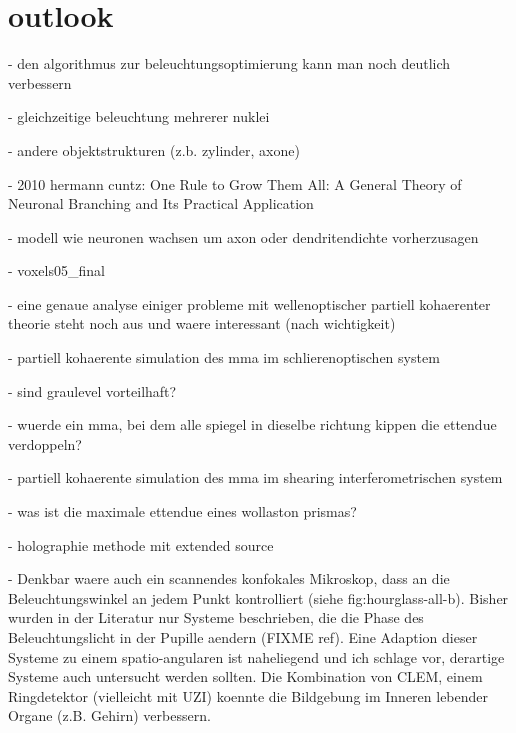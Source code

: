 \documentclass[oneside,a4paper,12pt,BCOR20mm,DIV14]{scrbook}
\begin{document}
\chapter{outlook}
\label{sec:outlook}
- den algorithmus zur beleuchtungsoptimierung kann man noch deutlich
  verbessern

  - gleichzeitige beleuchtung mehrerer nuklei

  - andere objektstrukturen (z.b. zylinder, axone)

    - 2010 hermann cuntz: One Rule to Grow Them All: A General Theory
      of Neuronal Branching and Its Practical Application

      - modell wie neuronen wachsen um axon oder dendritendichte
        vorherzusagen

  - voxels05\_final

- eine genaue analyse einiger probleme mit wellenoptischer partiell
  kohaerenter theorie steht noch aus und waere interessant (nach
  wichtigkeit)

  - partiell kohaerente simulation des mma im schlierenoptischen system

    - sind graulevel vorteilhaft?

    - wuerde ein mma, bei dem alle spiegel in dieselbe richtung kippen
      die ettendue verdoppeln?

  - partiell kohaerente simulation des mma im shearing
    interferometrischen system

    - was ist die maximale ettendue eines wollaston prismas?

  - holographie methode mit extended source

  - Denkbar waere auch ein scannendes konfokales Mikroskop, dass an
    die Beleuchtungswinkel an jedem Punkt kontrolliert (siehe
    fig:hourglass-all-b).  Bisher wurden in der Literatur nur Systeme
    beschrieben, die die Phase des Beleuchtungslicht in der Pupille
    aendern (FIXME ref). Eine Adaption dieser Systeme zu einem
    spatio-angularen ist naheliegend und ich schlage vor, derartige
    Systeme auch untersucht werden sollten. Die Kombination von CLEM,
    einem Ringdetektor (vielleicht mit UZI) koennte die Bildgebung im
    Inneren lebender Organe (z.B. Gehirn) verbessern.


%


%
\end{document}
